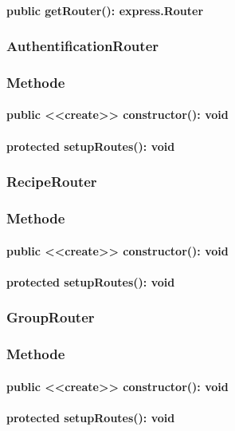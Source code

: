 \documentclass[parskip=full]{scrartcl}
\begin{document}
\paragraph{public getRouter(): express.Router}

\subsubsection{AuthentificationRouter}
\subsubsection*{Methode}
\paragraph{public <<create>> constructor(): void}
\paragraph{protected setupRoutes(): void}

\subsubsection{RecipeRouter}
\subsubsection*{Methode}
\paragraph{public <<create>> constructor(): void}
\paragraph{protected setupRoutes(): void}

\subsubsection{GroupRouter}
\subsubsection*{Methode}
\paragraph{public <<create>> constructor(): void}
\paragraph{protected setupRoutes(): void}
\end{document}
